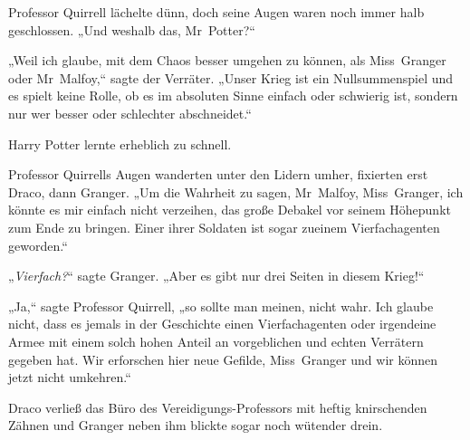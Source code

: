 Professor Quirrell lächelte dünn, doch seine Augen waren noch immer halb geschlossen. „Und weshalb das, Mr~Potter?“

„Weil ich glaube, mit dem Chaos besser umgehen zu können, als Miss~Granger oder Mr~Malfoy,“ sagte der Verräter. „Unser Krieg ist ein Nullsummenspiel und es spielt keine Rolle, ob es im absoluten Sinne einfach oder schwierig ist, sondern nur wer besser oder schlechter abschneidet.“

Harry Potter lernte erheblich zu schnell.

Professor Quirrells Augen wanderten unter den Lidern umher, fixierten erst Draco, dann Granger. „Um die Wahrheit zu sagen, Mr~Malfoy, Miss~Granger, ich könnte es mir einfach nicht verzeihen, das große Debakel vor seinem Höhepunkt zum Ende zu bringen. Einer ihrer Soldaten ist sogar zueinem Vierfachagenten geworden.“

„\emph{Vierfach?}“ sagte Granger. „Aber es gibt nur drei Seiten in diesem Krieg!“

„Ja,“ sagte Professor Quirrell, „so sollte man meinen, nicht wahr. Ich glaube nicht, dass es jemals in der Geschichte einen Vierfachagenten oder irgendeine Armee mit einem solch hohen Anteil an vorgeblichen und echten Verrätern gegeben hat. Wir erforschen hier neue Gefilde, Miss~Granger und wir können jetzt nicht umkehren.“

Draco verließ das Büro des Vereidigungs-Professors mit heftig knirschenden Zähnen und Granger neben ihm blickte sogar noch wütender drein.


